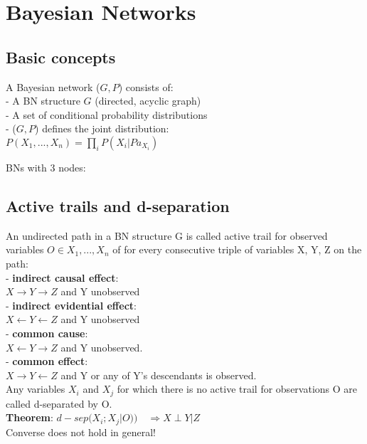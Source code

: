 \section{Bayesian Networks}
\subsection{Basic concepts}
A Bayesian network ($G, P$) consists of:\\
- A BN structure $G$ (directed, acyclic graph)\\
- A set of conditional probability distributions\\
- ($G, P$) defines the joint distribution:\\
    $P(X_1, ..., X_n)=\prod_iP(X_i | Pa_{X_i})$

BNs with 3 nodes:

\subsection{Active trails and d-separation}
An undirected path in a BN structure G is called active trail for observed variables $O \in {X_1, ..., X_n}$ of for every consecutive triple of variables X, Y, Z on the path:\\
- \textbf{indirect causal effect}:\\
$X \rightarrow Y \rightarrow Z$ and Y unobserved\\
- \textbf{indirect evidential effect}:\\
$X \leftarrow Y \leftarrow Z$ and Y unobserved\\
- \textbf{common cause}:\\
$X \leftarrow Y \rightarrow Z$ and Y unobserved.\\
- \textbf{common effect}:\\
$X \rightarrow Y \leftarrow Z$ and Y or any of Y's descendants is observed.\\
Any variables $X_i$ and $X_j$ for which there is no active trail for observations O are called d-separated by O.\\
\textbf{Theorem}: $d-sep(X_i;X_j|O)) \quad \Rightarrow X\perp Y |Z$\\
Converse does not hold in general!

